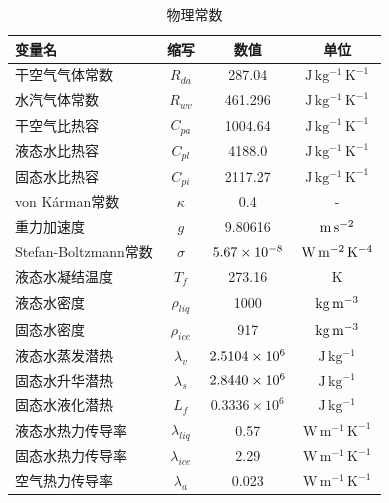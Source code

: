\begin{table}[]
\centering
\caption{物理常数}
\label{tab:物理常数chap4}
\begin{tabular}{lccc}
\toprule
变量名&缩写&数值&单位 \\\midrule
干空气气体常数            & $R_{da}$                       & 287.04     & $\mathrm{J\,kg^{-1}\,K^{-1}}$  \\ 
水汽气体常数             & $R_{wv}$                       & 461.296     & $\mathrm{J\,kg^{-1}\,K^{-1}}$  \\
干空气比热容             & $C_{pa} $                      & 1004.64    & $\mathrm{J\,kg^{-1}\,K^{-1}}$  \\
液态水比热容             & $C_{pl}$                       & 4188.0     & $\mathrm{J\,kg^{-1}\,K^{-1}}$  \\
固态水比热容             & $C_{pi}$                       & 2117.27    & $\mathrm{J\,kg^{-1}\,K^{-1}}$  \\
von K\'arman常数       & $\kappa$                               & 0.4        &    -     \\
重力加速度              & $g$                               & 9.80616    & $\rm m\,s^{-2}$    \\
Stefan-Boltzmann常数 & $\sigma$           & $5.67\times\rm 10^{-8}$  & $\rm W\,m^{-2}\,K^{-4}$ \\
液态水凝结温度            & $T_f$                            & 273.16     & K       \\
液态水密度              & $\rho_{liq}$    & 1000       & $\rm kg\,m^{-3}$   \\
固态水密度              & $\rho_{ice}$    & 917        & $\rm kg\,m^{-3}$   \\
液态水蒸发潜热            & $\lambda_v$       & $2.5104\times\rm 10^{6}$ & $\mathrm{J\,kg^{-1}}$    \\
固态水升华潜热            & $\lambda_s$       & $2.8440\times\rm 10^{6}$ & $\mathrm{J\,kg^{-1}}$    \\
固态水液化潜热            & $L_f$                           & $0.3336\times10^6$ & $\mathrm{J\,kg^{-1}}$    \\
液态水热力传导率           & $\lambda_{liq}$ & 0.57       & $\mathrm{W\,m^{-1}\,K^{-1}}$   \\
固态水热力传导率           & $\lambda_{ice}$ & 2.29       & $\mathrm{W\,m^{-1}\,K^{-1}}$   \\
空气热力传导率            & $\lambda_a$       & 0.023      & $\mathrm{W\,m^{-1}\,K^{-1}}$      \\\bottomrule
\end{tabular}
\end{table}



